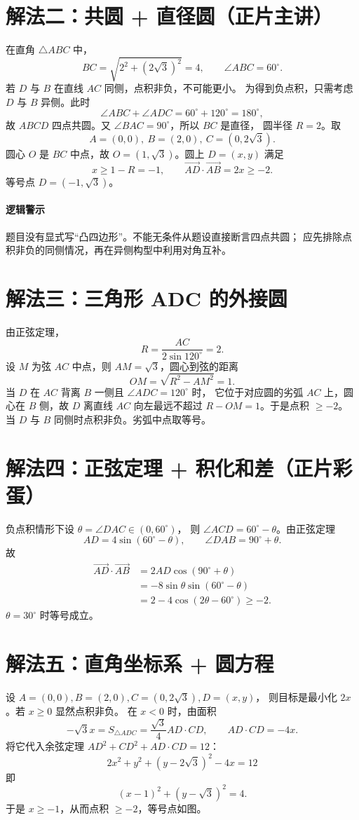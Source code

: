 \documentclass[UTF8,11pt,a4paper]{ctexart}
\newcommand{\V}[1]{\overrightarrow{#1}}
\begin{document}
\section{解法二：共圆 + 直径圆（正片主讲）}
在直角 $\triangle ABC$ 中，
\[
BC=\sqrt{2^2+(2\sqrt3)^2}=4,\qquad \angle ABC=60^\circ.
\]
若 $D$ 与 $B$ 在直线 $AC$ 同侧，点积非负，不可能更小。
为得到负点积，只需考虑 $D$ 与 $B$ 异侧。此时
\[
\angle ABC+\angle ADC=60^\circ+120^\circ=180^\circ,
\]
故 $ABCD$ 四点共圆。又 $\angle BAC=90^\circ$，所以 $BC$ 是直径，
圆半径 $R=2$。取
\[
A=(0,0),\ B=(2,0),\ C=(0,2\sqrt3).
\]
圆心 $O$ 是 $BC$ 中点，故 $O=(1,\sqrt3)$。圆上 $D=(x,y)$ 满足
\[
x\ge 1-R=-1,\qquad
\V{AD}\cdot\V{AB}=2x\ge-2.
\]
等号点 $D=(-1,\sqrt3)$。

\paragraph{逻辑警示}
题目没有显式写“凸四边形”。不能无条件从题设直接断言四点共圆；
应先排除点积非负的同侧情况，再在异侧构型中利用对角互补。

\section{解法三：三角形 ADC 的外接圆}
由正弦定理，
\[
R=\frac{AC}{2\sin120^\circ}=2.
\]
设 $M$ 为弦 $AC$ 中点，则 $AM=\sqrt3$，圆心到弦的距离
\[
OM=\sqrt{R^2-AM^2}=1.
\]
当 $D$ 在 $AC$ 背离 $B$ 一侧且 $\angle ADC=120^\circ$ 时，
它位于对应圆的劣弧 $AC$ 上，圆心在 $B$ 侧，故 $D$ 离直线 $AC$
向左最远不超过 $R-OM=1$。于是点积 $\ge -2$。
当 $D$ 与 $B$ 同侧时点积非负。劣弧中点取等号。

\section{解法四：正弦定理 + 积化和差（正片彩蛋）}
负点积情形下设 $\theta=\angle DAC\in(0,60^\circ)$，
则 $\angle ACD=60^\circ-\theta$。由正弦定理
\[
AD=4\sin(60^\circ-\theta),\qquad \angle DAB=90^\circ+\theta.
\]
故
\begin{align*}
\V{AD}\cdot\V{AB}
&=2AD\cos(90^\circ+\theta)\\
&=-8\sin\theta\sin(60^\circ-\theta)\\
&=2-4\cos(2\theta-60^\circ)\ge-2.
\end{align*}
$\theta=30^\circ$ 时等号成立。

\section{解法五：直角坐标系 + 圆方程}
设 $A=(0,0),B=(2,0),C=(0,2\sqrt3),D=(x,y)$，
则目标是最小化 $2x$。若 $x\ge0$ 显然点积非负。
在 $x<0$ 时，由面积
\[
-\sqrt3x=S_{\triangle ADC}
=\frac{\sqrt3}{4}AD\cdot CD,
\qquad AD\cdot CD=-4x.
\]
将它代入余弦定理 $AD^2+CD^2+AD\cdot CD=12$：
\[
2x^2+y^2+(y-2\sqrt3)^2-4x=12
\]
即
\[
\boxed{(x-1)^2+(y-\sqrt3)^2=4}.
\]
于是 $x\ge-1$，从而点积 $\ge-2$，等号点如图。
\end{document}

